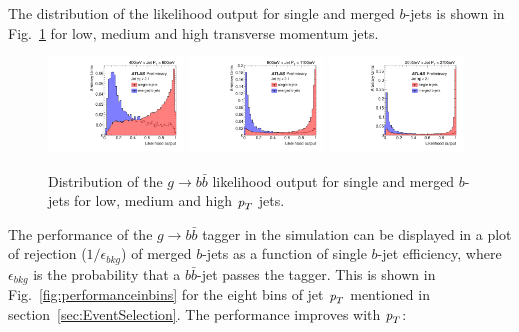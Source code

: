 The distribution of the likelihood output for single and merged $b$-jets is shown in  Fig.~\ref{fig:outputinbins} for low, medium and high transverse momentum jets.

\begin{figure}[tp]
\centering
\includegraphics[width=0.32\textwidth,viewport=40 0 540 550]{FIGS/Likelihood/NNoutput040_LihoodKDE.pdf}
\includegraphics[width=0.32\textwidth,viewport=40 0 540 550,clip]{FIGS/Likelihood/NNoutput080_LihoodKDE.pdf}
\includegraphics[width=0.32\textwidth,viewport=40 0 540 550,clip]{FIGS/Likelihood/NNoutput200_LihoodKDE.pdf}  
\caption{Distribution of the $g\rightarrow b \bar{b}$ likelihood output for single and merged $b$-jets for low, medium and high ${\emph{p}_{T}}$ jets.}
\label{fig:outputinbins}
\end{figure}

The performance of the $g\rightarrow b \bar{b}$ tagger in the simulation can be  %
displayed in a plot of rejection ($1/\epsilon_{bkg}$) of merged $b$-jets as a function of single $b$-jet efficiency, where $\epsilon_{bkg}$ is the probability that a $b \bar{b}$-jet passes the tagger. This is shown in Fig.~\ref{fig:performanceinbins} for the eight bins of jet ${\emph{p}_{T}}$ mentioned in section~\ref{sec:EventSelection}. The performance improves with ${\emph{p}_{T}}$:


